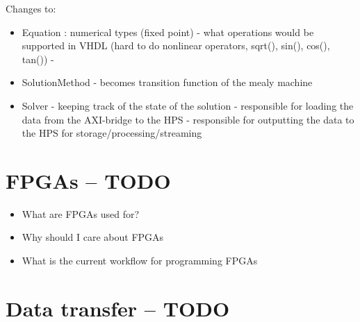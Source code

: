 Changes to:
\begin{itemize}
	\item Equation : numerical types (fixed point) - what operations would be supported in VHDL (hard to do nonlinear operators, sqrt(), sin(), cos(), tan()) - 
	\item SolutionMethod - becomes transition function of the mealy machine
	\item Solver - keeping track of the state of the solution - responsible for loading the data from the AXI-bridge to the HPS - responsible for outputting the data to the HPS for storage/processing/streaming
\end{itemize}

\section{FPGAs -- TODO}
\begin{itemize}
	\item What are FPGAs used for?
	\item Why should I care about FPGAs
	\item What is the current workflow for programming FPGAs
\end{itemize}


\section{Data transfer -- TODO}
